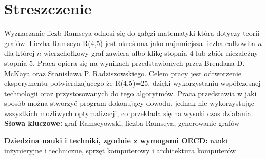 \chapter*{Streszczenie}
\indent 

Wyznaczanie liczb Ramseya odnosi się do gałęzi matematyki która dotyczy teorii grafów. Liczba Ramseya R(4,5) jest określona jako najmniejsza liczba całkowita $n$ dla której $n$-wierzchołkowy graf zawiera albo klikę stopnia 4 lub zbiór niezależny stopnia 5. Praca opiera się na wynikach przedstawionych przez Brendana D. McKaya oraz Stanisława P. Radziszowskiego. Celem pracy jest odtworzenie eksperymentu potwierdzającego że R(4,5)=25, dzięki wykorzystaniu współczesnej technologii oraz przystosowanych do tego algorytmów. Praca przedstawia w jaki sposób można stworzyć program dokonujący dowodu, jednak nie wykorzystując wszystkich możliwych optymalizacji, co przekłada się na wysoki czas działania.
\vspace{0.5cm}\newline
\textbf{Słowa kluczowe:} graf Ramseyowski, liczba Ramseya, generowanie grafów
\vspace{0.5cm}

\noindent \textbf{Dziedzina nauki i techniki, zgodnie z wymogami OECD:} nauki inżynieryjne i techniczne, sprzęt komputerowy i architektura komputerów
